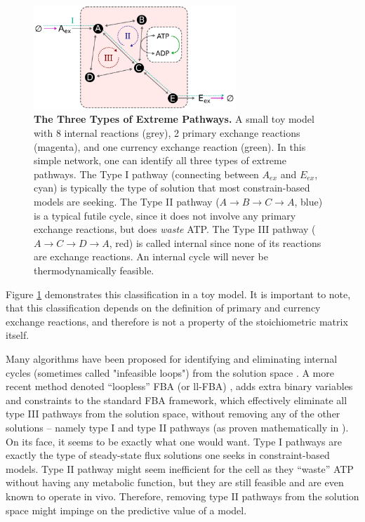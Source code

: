 \documentclass[twocolumn]{article}
\begin{document}
\begin{figure}[ht!]
	\includegraphics[width=3in]{figure1.pdf}
	\caption{\textbf{The Three Types of Extreme Pathways.}
		A small toy model with 8 internal reactions (grey), 2 primary exchange reactions (magenta), and one currency exchange reaction (green). In this simple network, one can identify all three types of extreme pathways. The Type I pathway (connecting between $A_{ex}$ and $E_{ex}$, cyan) is typically the type of solution that most constrain-based models are seeking. The Type II pathway ($A \rightarrow B \rightarrow C \rightarrow A$, blue) is a typical futile cycle, since it does not involve any primary exchange reactions, but does \emph{waste} ATP. The Type III pathway ($A \rightarrow C \rightarrow D \rightarrow A$, red) is called internal since none of its reactions are exchange reactions. An internal cycle will never be thermodynamically feasible.}
    \label{fig:cycles}
\end{figure}
Figure \ref{fig:cycles} demonstrates this classification in a toy model. It is important to note, that this classification depends on the definition of primary and currency exchange reactions, and therefore is not a property of the stoichiometric matrix itself.

Many algorithms have been proposed for identifying and eliminating internal cycles (sometimes called "infeasible loops") from the solution space \cite{Price2002-ef, Kummel2006-qn, Price2006-ua, Wright2008-rh}. A more recent method denoted ``loopless'' FBA (or ll-FBA) \cite{Schellenberger2011-bq}, adds extra binary variables and constraints to the standard FBA framework, which effectively eliminate all type III pathways from the solution space, without removing any of the other solutions -- namely type I and type II pathways (as proven mathematically in \cite{Noor2012-qb}).
On its face, it seems to be exactly what one would want. Type I pathways are exactly the type of steady-state flux solutions one seeks in constraint-based models. Type II pathway might seem inefficient for the cell as they ``waste'' ATP without having any metabolic function, but they are still feasible and are even known to operate in vivo. Therefore, removing type II pathways from the solution space might impinge on the predictive value of a model.
\end{document}
